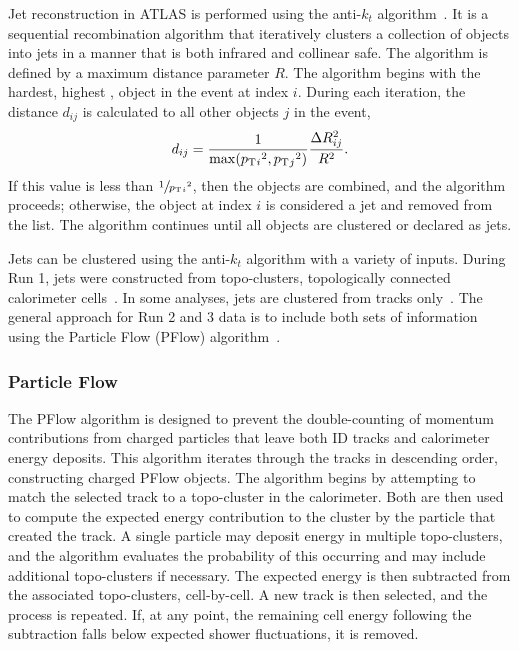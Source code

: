 Jet reconstruction in ATLAS is performed using the anti-$k_t$ algorithm~\cite{AntiKt}.
It is a sequential recombination algorithm that iteratively clusters a collection of objects into jets in a manner that is both infrared and collinear safe.
The algorithm is defined by a maximum distance parameter $R$.
The algorithm begins with the hardest, highest \pt, object in the event at index $i$.
During each iteration, the distance $d_{ij}$ is calculated to all other objects $j$ in the event,
\begin{equation}
    d_{ij} = \frac{1}{\max(p_\mathrm{T}{_i}^2, p_\mathrm{T}{_j}^2)} \frac{\Delta R_{ij}^2}{R^2}.
\end{equation}
If this value is less than $\sfrac{1}{p_\mathrm{T}{_i}^2}$, then the objects are combined, and the algorithm proceeds; otherwise, the object at index $i$ is considered a jet and removed from the list.
The algorithm continues until all objects are clustered or declared as jets.

Jets can be clustered using the anti-$k_t$ algorithm with a variety of inputs.
During Run 1, jets were constructed from topo-clusters, topologically connected calorimeter cells~\cite{TopoJets}.
In some analyses, jets are clustered from tracks only~\cite{TrackJets}.
The general approach for Run 2 and 3 data is to include both sets of information using the Particle Flow (PFlow) algorithm~\cite{PFlow}.

\subsubsection{Particle Flow}

The PFlow algorithm is designed to prevent the double-counting of momentum contributions from charged particles that leave both ID tracks and calorimeter energy deposits.
This algorithm iterates through the tracks in descending \pt order, constructing charged PFlow objects.
The algorithm begins by attempting to match the selected track to a topo-cluster in the calorimeter.
Both are then used to compute the expected energy contribution to the cluster by the particle that created the track.
A single particle may deposit energy in multiple topo-clusters, and the algorithm evaluates the probability of this occurring and may include additional topo-clusters if necessary.
The expected energy is then subtracted from the associated topo-clusters, cell-by-cell.
A new track is then selected, and the process is repeated.
If, at any point, the remaining cell energy following the subtraction falls below expected shower fluctuations, it is removed.

